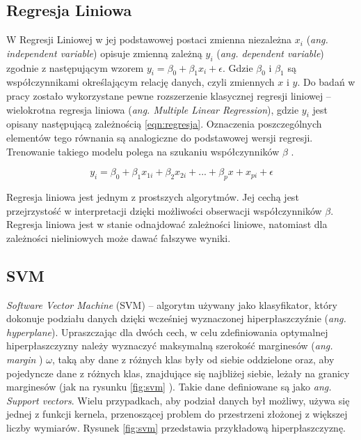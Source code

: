\subsection{Regresja Liniowa}
W Regresji Liniowej w jej podstawowej postaci zmienna niezależna $x_i$ ({\em ang. independent variable}) opisuje zmienną zależną $y_i$ ({\em ang. dependent variable}) zgodnie z następującym wzorem $y_i = \beta_0 + \beta_1 x_i + \epsilon$. Gdzie $\beta_0$ i $\beta_1$ są współczynnikami określającym relację danych, czyli zmiennych $x$ i $y$. Do badań w pracy zostało wykorzystane pewne rozszerzenie klasycznej regresji liniowej -- wielokrotna regresja liniowa ({\em ang. Multiple Linear Regression}), gdzie $y_i$ jest opisany następującą zależnością \ref{eqn:regresja}. Oznaczenia poszczególnych elementów tego równania są analogiczne do podstawowej wersji regresji. Trenowanie takiego modelu polega na szukaniu współczynników $\beta$ \cite{mlr} .\par

\begin{equation}
\label{eqn:regresja}
y_i = \beta_0 + \beta_1 x_{1i} + \beta_2 x_{2i} + ... + \beta_p x+x_{pi} + \epsilon
\end{equation}

Regresja liniowa jest jednym z prostszych algorytmów. Jej cechą jest przejrzystość w interpretacji  dzięki możliwości obserwacji współczynników $\beta$. Regresja liniowa jest w stanie odnajdować zależności liniowe, natomiast dla zależności nieliniowych może dawać fałszywe wyniki.

\subsection{SVM}
{\em Software Vector Machine} (SVM) -- algorytm używany jako klasyfikator, który dokonuje podziału danych dzięki wcześniej wyznaczonej hiperpłaszczyźnie ({\em ang. hyperplane}). Upraszczając dla dwóch cech, w celu zdefiniowania optymalnej hiperpłaszczyzny należy wyznaczyć maksymalną szerokość marginesów ({\em ang. margin} ) $\omega$, taką aby dane z różnych klas były od siebie oddzielone oraz, aby pojedyncze dane z różnych klas, znajdujące się najbliżej siebie, leżały na granicy marginesów (jak na rysunku \ref{fig:svm} ).  Takie dane definiowane są jako {\em ang. Support vectors}. Wielu przypadkach, aby podział danych był możliwy, używa się  jednej z funkcji kernela, przenoszącej problem do przestrzeni złożonej z większej liczby wymiarów. Rysunek \ref{fig:svm} przedstawia przykładową hiperpłaszczyznę.\par

